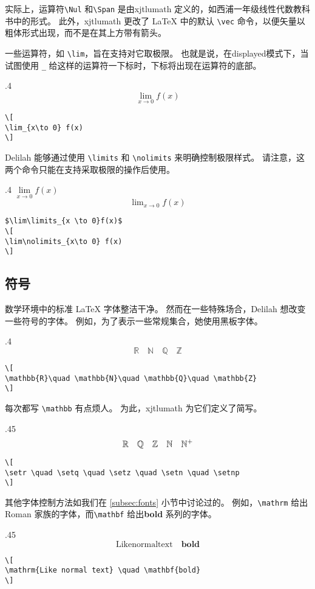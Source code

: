 实际上，运算符\verb=\Nul= 和\verb=\Span= 是由xjtlumath 定义的，如西浦一年级线性代数教科书中的形式。 此外，xjtlumath 更改了 \LaTeX{} 中的默认 \verb=\vec= 命令，以便矢量以粗体形式出现，而不是在其上方带有箭头。

一些运算符，如 \verb=\lim=，旨在支持对它取极限。 也就是说，在displayed模式下，当试图使用 \verb=_= 给这样的运算符一下标时，下标将出现在运算符的底部。
\begin{parexammar}{.4\textandmarginlen}{
\[
\lim_{x\to 0} f(x)
\]
}
\begin{lstlisting}
\[
\lim_{x\to 0} f(x)
\]
\end{lstlisting}
\end{parexammar}

Delilah 能够通过使用 \verb=\limits= 和 \verb=\nolimits= 来明确控制极限样式。 请注意，这两个命令只能在支持采取极限的操作后使用。
\begin{parexammar}{.4\textandmarginlen}{
$\lim\limits_{x \to 0}f(x)$
\[
\lim\nolimits_{x\to 0} f(x)
\]
}
\begin{lstlisting}
$\lim\limits_{x \to 0}f(x)$
\[
\lim\nolimits_{x\to 0} f(x)
\]
\end{lstlisting}
\end{parexammar}

\subsection{符号}
数学环境中的标准 \LaTeX{} 字体整洁干净。 然而在一些特殊场合，Delilah 想改变一些符号的字体。 例如，为了表示一些常规集合，她使用黑板字体。
\begin{parexammar}{.4\textandmarginlen}{
\[
\mathbb{R}\quad \mathbb{N}\quad \mathbb{Q}\quad \mathbb{Z}
\]
}
\begin{lstlisting}
\[
\mathbb{R}\quad \mathbb{N}\quad \mathbb{Q}\quad \mathbb{Z}
\]
\end{lstlisting}
\end{parexammar}

每次都写 \verb=\mathbb= 有点烦人。 为此，xjtlumath 为它们定义了简写。
\begin{parexammar}{.45\textandmarginlen}{
\[
\mathbb{R} \quad \mathbb{Q} \quad \mathbb{Z} \quad \mathbb{N} \quad \mathbb{N}^+
\]
}
\begin{lstlisting}
\[
\setr \quad \setq \quad \setz \quad \setn \quad \setnp
\]
\end{lstlisting}
\end{parexammar}

其他字体控制方法如我们在 \ref{subsec:fonts} 小节中讨论过的。 例如，\verb=\mathrm= 给出\textrm{Roman} 家族的字体，而\verb=\mathbf= 给出\textbf{bold} 系列的字体。
\begin{parexammar}{.45\textandmarginlen}{
\[
\mathrm{Like normal text} \quad \mathbf{bold}
\]
}
\begin{lstlisting}
\[
\mathrm{Like normal text} \quad \mathbf{bold}
\]
\end{lstlisting}
\end{parexammar}